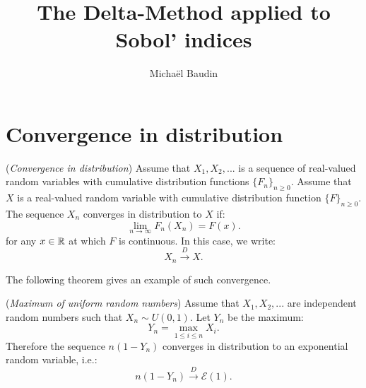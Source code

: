 \documentclass{article}
\begin{document}
\title{The Delta-Method applied to Sobol' indices}

\author{Michaël Baudin}

\maketitle



\tableofcontents


\section{Convergence in distribution}

\begin{definition}
(\emph{Convergence in distribution})
Assume that $X_1,X_2,...$ is a sequence of real-valued random variables 
with cumulative distribution functions $\{F_n\}_{n\geq 0}$. 
Assume that $X$ is a real-valued random variable 
with cumulative distribution function $\{F\}_{n\geq 0}$. 
The sequence $X_n$ converges in distribution to $X$ if:
$$
\lim_{n\rightarrow \infty} F_n(X_n)=F(x).
$$
for any $x\in \mathbb{R}$ at which $F$ is continuous.
In this case, we write:
$$
X_n \xrightarrow{D} X.
$$
\end{definition}

The following theorem gives an example of such convergence. 

\begin{theorem}
(\emph{Maximum of uniform random numbers})
Assume that $X_1,X_2,...$ are independent random numbers such that $X_n\sim U(0,1)$. 
Let $Y_n$ be the maximum:
$$
Y_n = \max_{1\leq i\leq n}  X_i.
$$
Therefore the sequence $n(1-Y_n)$ converges in distribution to an exponential random variable, i.e.:
$$
n(1-Y_n) \xrightarrow{D} \mathcal{E}(1).
$$
\end{theorem}
\end{document}
